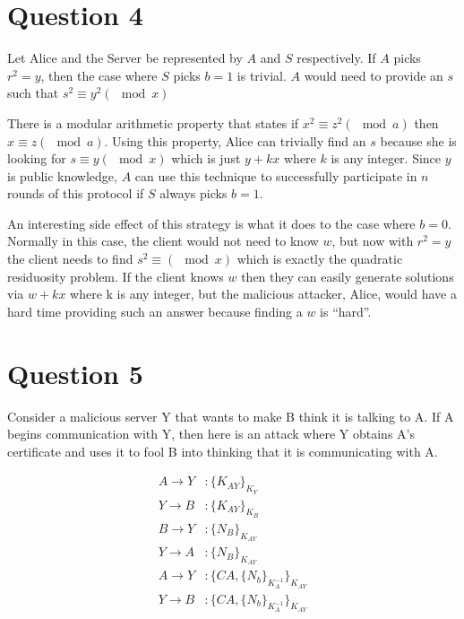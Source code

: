 \documentclass[a4paper]{article}
\begin{document}
\section{Question 4}
Let Alice and the Server be represented by $A$ and $S$ respectively. If $A$ picks $r^2=y$, then
the case where $S$ picks $b=1$ is trivial. $A$ would need to provide an $s$ such that
$s^2 \equiv y^2(\mod x)$

There is a modular arithmetic property that states if $x^2 \equiv z^2(\mod a)$ then $x \equiv z(\mod a)$.
Using this property, Alice can trivially find an $s$ because she is looking for $s \equiv y(\mod x)$ which is just
$y+ kx$ where $k$ is any integer. Since $y$ is public knowledge, $A$ can use this technique to successfully
participate in $n$ rounds of this protocol if $S$ always picks $b=1$.

An interesting side effect of this strategy is what it does to the case where $b=0$.
Normally in this case, the client would not need to know $w$, but now with $r^2=y$
the client needs to find $s^2 \equiv (\mod x)$ which is exactly the quadratic residuosity problem.
If the client knows $w$ then they can easily generate solutions via $w + kx$ where k is any integer, but
the malicious attacker, Alice, would have a hard time providing such an answer because finding a $w$ is ``hard''.

\section{Question 5}
Consider a malicious server Y that wants to make B think it is talking to A. If A
begins communication with Y, then here is an attack where Y obtains A's certificate and
uses it to fool B into thinking that it is communicating with A.

\begin{align*}
	A \longrightarrow Y &: \{K_{AY}\}_{K_{Y}}\\
	Y \longrightarrow B &: \{K_{AY}\}_{K_{B}}\\
	B \longrightarrow Y &: \{N_B\}_{K_{AY}}\\
	Y \longrightarrow A &: \{N_B\}_{K_{AY}}\\
	A \longrightarrow Y &: \{CA,\{N_b\}_{K_A^{-1}} \}_{K_{AY}}\\
	Y \longrightarrow B &: \{CA,\{N_b\}_{K_A^{-1}} \}_{K_{AY}}\\
\end{align*}
\end{document}
